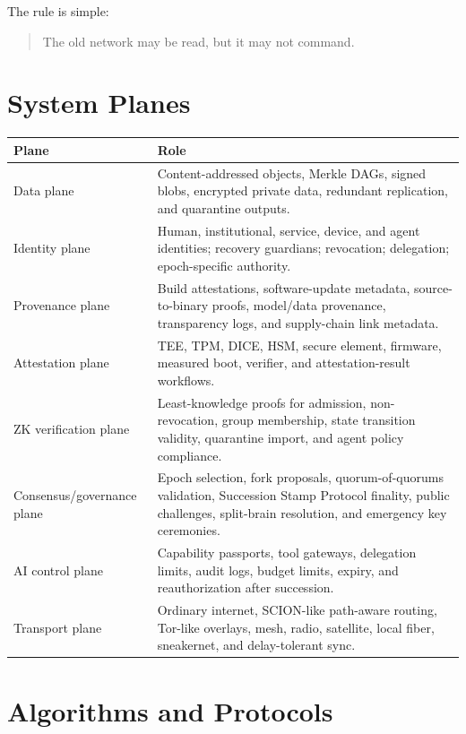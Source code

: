 \documentclass[11pt,letterpaper]{article}
\begin{document}
The rule is simple:

\begin{quote}
The old network may be read, but it may not command.
\end{quote}

\section{System Planes}

\begin{longtable}{p{}p{}}
\toprule
\textbf{Plane} & \textbf{Role} \\
\midrule
Data plane & Content-addressed objects, Merkle DAGs, signed blobs, encrypted private data, redundant replication, and quarantine outputs. \\
\addlinespace
Identity plane & Human, institutional, service, device, and agent identities; recovery guardians; revocation; delegation; epoch-specific authority. \\
\addlinespace
Provenance plane & Build attestations, software-update metadata, source-to-binary proofs, model/data provenance, transparency logs, and supply-chain link metadata. \\
\addlinespace
Attestation plane & TEE, TPM, DICE, HSM, secure element, firmware, measured boot, verifier, and attestation-result workflows. \\
\addlinespace
ZK verification plane & Least-knowledge proofs for admission, non-revocation, group membership, state transition validity, quarantine import, and agent policy compliance. \\
\addlinespace
Consensus/governance plane & Epoch selection, fork proposals, quorum-of-quorums validation, Succession Stamp Protocol finality, public challenges, split-brain resolution, and emergency key ceremonies. \\
\addlinespace
AI control plane & Capability passports, tool gateways, delegation limits, audit logs, budget limits, expiry, and reauthorization after succession. \\
\addlinespace
Transport plane & Ordinary internet, SCION-like path-aware routing, Tor-like overlays, mesh, radio, satellite, local fiber, sneakernet, and delay-tolerant sync. \\
\bottomrule
\end{longtable}

\section{Algorithms and Protocols}
\end{document}
